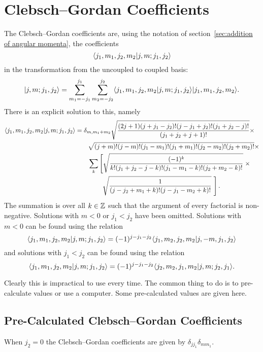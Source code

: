 \section{Clebsch--Gordan Coefficients}
    The Clebsch--Gordan coefficients are, using the notation of section~\ref{sec:addition of angular momenta}, the coefficients
    \[\langle {j_1, m_1, j_2, m_2} \vert {j, m; j_1, j_2} \rangle\]
    in the transformation from the uncoupled to coupled basis:
    \[\vert {j, m; j_1, j_2} \rangle = \sum_{m_1 = -j_1}^{j_1}\sum_{m_2 = -j_2}^{j_2} \langle {j_1, m_1, j_2, m_2} \vert {j, m; j_1, j_2} \rangle \vert {j_1, m_1, j_2, m_2} \rangle.\]
    There is an explicit solution to this, namely
    \begin{align*}
        \langle {j_1, m_1, j_2, m_2} \vert {j, m; j_1, j_2} \rangle &= \delta_{m,m_1+m_2} \sqrt{\frac{(2j + 1)(j + j_1 - j_2)!(j - j_1 + j_2)!(j_1 + j_2 - j)!}{(j_1 + j_2 + j + 1)!}} \times\\
        &\qquad \sqrt{(j + m)!(j - m)!(j_1 - m_1)!(j_1 + m_1)!(j_2 - m_2)!(j_2 + m_2)!} \times\\
        &\qquad \sum_k \left[\sqrt{\frac{(-1)^k}{k!(j_1 + j_2 - j - k)!(j_1 - m_1 - k)!(j_2 + m_2 - k)!}}\right.\times\\
        &\qquad\qquad \left.\sqrt{\frac{1}{(j - j_2 + m_1 + k)!(j - j_1 - m_2 + k)!}}\,\,\right].
    \end{align*}
    The summation is over all \(k\in\mathbb{Z}\) such that the argument of every factorial is non-negative.
    Solutions with \(m < 0\) or \(j_1 < j_2\) have been omitted.
    Solutions with \(m < 0\) can be found using the relation
    \[\langle {j_1, m_1, j_2, m_2} \vert {j, m; j_1, j_2} \rangle = (-1)^{j - j_1 - j_2}\langle {j_1, m_2, j_2, m_2} \vert {j, -m, j_1, j_2} \rangle\]
    and solutions with \(j_1 < j_2\) can be found using the relation
    \[\langle {j_1, m_1, j_2, m_2} \vert {j, m; j_1, j_2} \rangle = (-1)^{j - j_1 - j_2}\langle {j_2, m_2, j_1, m_2} \vert {j, m; j_2, j_1} \rangle.\]
    
    Clearly this is impractical to use every time.
    The common thing to do is to pre-calculate values or use a computer.
    Some pre-calculated values are given here.
    \subsection{Pre-Calculated Clebsch--Gordan Coefficients}
    When \(j_2 = 0\)  the Clebsch--Gordan coefficients are given by \(\delta_{jj_1}\delta_{mm_1}\).
    
